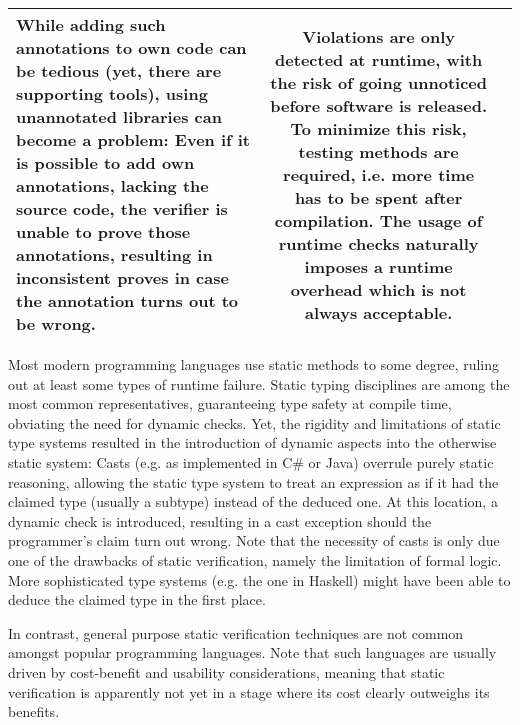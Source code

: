 \begin{tabular}{l | c | c}
\begin{minipage}{170pt}
        While adding such annotations to own code can be tedious (yet, there are supporting tools), using unannotated libraries can become a problem:
        Even if it is possible to add own annotations, lacking the source code, the verifier is unable to prove those annotations, resulting in inconsistent proves in case the annotation turns out to be wrong.
        \vspace{5pt}
    \end{minipage}
    &
    \begin{minipage}{170pt}
        \vspace{3pt}
        Violations are only detected at runtime, with the risk of going unnoticed before software is released.
        To minimize this risk, testing methods are required, i.e. more time has to be spent after compilation.
        The usage of runtime checks naturally imposes a runtime overhead which is not always acceptable.
        \vspace{5pt}
    \end{minipage}\\\hline
\end{tabular}

Most modern programming languages use static methods to some degree, ruling out at least some types of runtime failure.
Static typing disciplines are among the most common representatives, guaranteeing type safety at compile time, obviating the need for dynamic checks.
Yet, the rigidity and limitations of static type systems resulted in the introduction of dynamic aspects into the otherwise static system:
Casts (e.g. as implemented in C\# or Java) overrule purely static reasoning, allowing the static type system to treat an expression as if it had the claimed type (usually a subtype) instead of the deduced one.
At this location, a dynamic check is introduced, resulting in a cast exception should the programmer's claim turn out wrong.
Note that the necessity of casts is only due one of the drawbacks of static verification, namely the limitation of formal logic.
More sophisticated type systems (e.g. the one in Haskell) might have been able to deduce the claimed type in the first place.

In contrast, general purpose static verification techniques are not common amongst popular programming languages.
Note that such languages are usually driven by cost-benefit and usability considerations, meaning that static verification is apparently not yet in a stage where its cost clearly outweighs its benefits.


